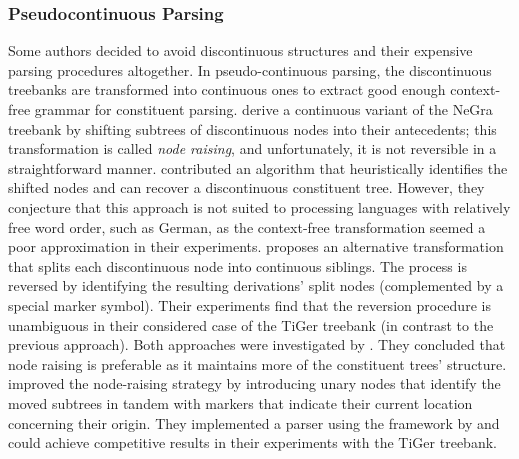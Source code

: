\documentclass[../document.tex]{subfiles}
\begin{document}
    \subsubsection*{Pseudocontinuous Parsing}
    Some authors decided to avoid discontinuous structures and their expensive parsing procedures altogether.
    In pseudo-continuous parsing, the discontinuous treebanks are transformed into continuous ones to extract good enough context-free grammar for constituent parsing.
    \citet{DubKel03} derive a continuous variant of the NeGra treebank by shifting subtrees of discontinuous nodes into their antecedents; this transformation is called \emph{node raising}, and unfortunately, it is not reversible in a straightforward manner.
    \citet{levy-manning-2004-deep} contributed an algorithm that heuristically identifies the shifted nodes and can recover a discontinuous constituent tree.
    However, they conjecture that this approach is not suited to processing languages with relatively free word order, such as German, as the context-free transformation seemed a poor approximation in their experiments.
    \citet{boyd-2007-discontinuity} proposes an alternative transformation that splits each discontinuous node into continuous siblings.
    The process is reversed by identifying the resulting derivations' split nodes (complemented by a special marker symbol).
    Their experiments find that the reversion procedure is unambiguous in their considered case of the TiGer treebank (in contrast to the previous approach).
    Both approaches were investigated by \citet{hsu2010comparing}.
    They concluded that node raising is preferable as it maintains more of the constituent trees' structure.
    \citet{Ver16} improved the node-raising strategy by introducing unary nodes that identify the moved subtrees in tandem with markers that indicate their current location concerning their origin.
    They implemented a parser using the  framework by \citet{Petrov06} and could achieve competitive results in their experiments with the TiGer treebank.
    
    
\end{document}
